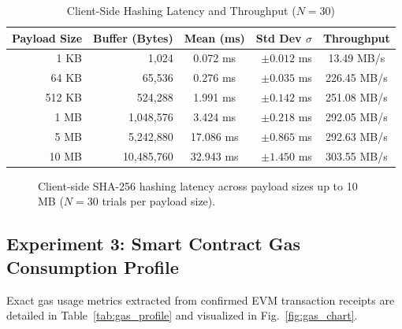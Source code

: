 \documentclass[10pt,conference,letterpaper]{IEEEtran}
\begin{document}
\begin{table}[htbp]
\centering
\caption{Client-Side Hashing Latency and Throughput ($N = 30$)}
\label{tab:client_throughput}
\footnotesize
\setlength{\tabcolsep}{3pt}
\begin{tabular}{rrcrc}
\toprule
\textbf{Payload Size} & \textbf{Buffer (Bytes)} & \textbf{Mean (ms)} & \textbf{Std Dev $\sigma$} & \textbf{Throughput} \\
\midrule
1 KB   & 1,024       & 0.072 ms  & $\pm0.012$ ms & 13.49 MB/s \\
64 KB  & 65,536      & 0.276 ms  & $\pm0.035$ ms & 226.45 MB/s \\
512 KB & 524,288     & 1.991 ms  & $\pm0.142$ ms & 251.08 MB/s \\
1 MB   & 1,048,576   & 3.424 ms  & $\pm0.218$ ms & 292.05 MB/s \\
5 MB   & 5,242,880   & 17.086 ms & $\pm0.865$ ms & 292.63 MB/s \\
10 MB  & 10,485,760  & 32.943 ms & $\pm1.450$ ms & 303.55 MB/s \\
\bottomrule
\end{tabular}
\end{table}

\begin{figure}[htbp]
\centering
{}
\caption{Client-side SHA-256 hashing latency across payload sizes up to 10 MB ($N = 30$ trials per payload size).}
\label{fig:hashing_latency}
\end{figure}

\subsection{Experiment 3: Smart Contract Gas Consumption Profile}
Exact gas usage metrics extracted from confirmed EVM transaction receipts are detailed in Table~\ref{tab:gas_profile} and visualized in Fig.~\ref{fig:gas_chart}.
\end{document}

